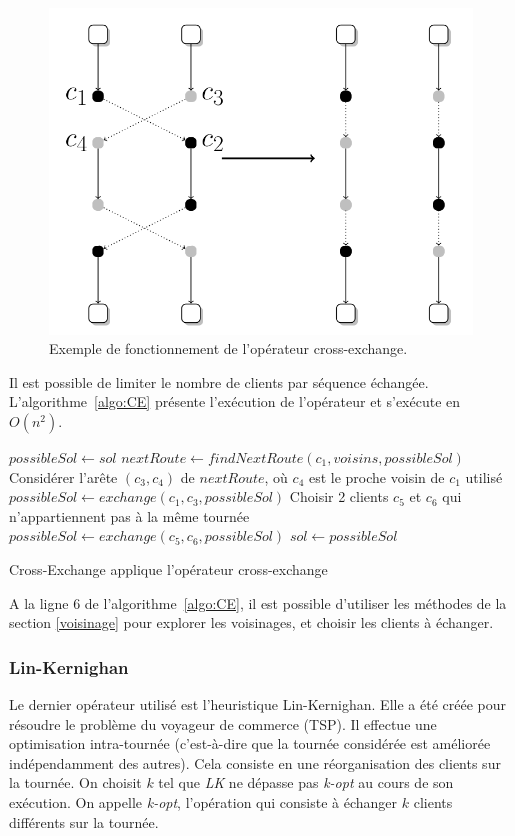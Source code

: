 \documentclass[a4paper,11pt]{article}%
\begin{document}
\begin{figure}
\centering
\includegraphics[scale=0.2]{cross_exchange_big.png}
\caption{Exemple de fonctionnement de l'opérateur cross-exchange.}
\label{CE}
\end{figure}

Il est possible de limiter le nombre de clients par séquence échangée.
L'algorithme~\ref{algo:CE} présente l'exécution de l'opérateur et s'exécute en $O(n^2)$.

\begin{algorithm}
\DontPrintSemicolon 
{}
$possibleSol \gets sol$\;
$nextRoute \gets findNextRoute(c_1,voisins,possibleSol)$\;
Considérer l'arête $(c_3,c_4)$ de $nextRoute$, où $c_4$ est le proche voisin de $c_1$ utilisé\;
$possibleSol \gets exchange(c_1,c_3,possibleSol)$\;
Choisir 2 clients $c_5$ et $c_6$ qui n'appartiennent pas à la même tournée\;
$possibleSol \gets exchange(c_5,c_6,possibleSol)$\;
 {
	$sol \gets possibleSol$\;
}
\;
\caption{{\sc Cross-Exchange} applique l'opérateur cross-exchange}
\label{algo:CE}
\end{algorithm}

A la ligne $6$ de l'algorithme~\ref{algo:CE}, il est possible d'utiliser les méthodes de la section \ref{voisinage} pour explorer les voisinages, et choisir les clients à échanger.

\subsubsection{Lin-Kernighan}
\label{Lin-Kernighan}
Le dernier opérateur utilisé est l'heuristique Lin-Kernighan. Elle a été créée pour résoudre le problème du voyageur de commerce (TSP). 
Il effectue une optimisation intra-tournée (c'est-à-dire que la tournée considérée est améliorée indépendamment des autres).
Cela consiste en une réorganisation des clients sur la tournée. On choisit $k$ tel que \emph{LK} ne dépasse pas \emph{k-opt} au cours de son exécution. 
On appelle \emph{k-opt}, l'opération qui consiste à échanger $k$ clients différents sur la tournée.
\end{document}
